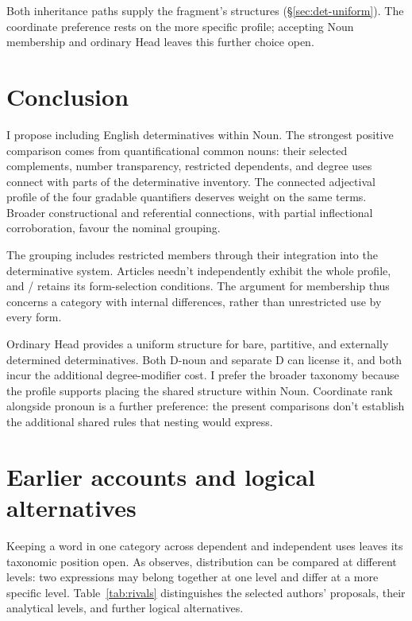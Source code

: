 \documentclass[12pt]{article}
\begin{document}
Both inheritance paths supply the fragment's structures (§\ref{sec:det-uniform}). The coordinate preference rests on the more specific profile; accepting Noun membership and ordinary Head leaves this further choice open.

\section{Conclusion}\label{sec:conclusion}

I propose including English determinatives within Noun. The strongest positive comparison comes from quantificational common nouns: their selected complements, number transparency, restricted dependents, and degree uses connect with parts of the determinative inventory. The connected adjectival profile of the four gradable quantifiers deserves weight on the same terms. Broader constructional and referential connections, with partial inflectional corroboration, favour the nominal grouping.

The grouping includes restricted members through their integration into the determinative system. Articles needn't independently exhibit the whole profile, and / retains its form-selection conditions. The argument for membership thus concerns a category with internal differences, rather than unrestricted use by every form.

Ordinary Head provides a uniform structure for bare, partitive, and externally determined determinatives. Both D-noun and separate D can license it, and both incur the additional degree-modifier cost. I prefer the broader taxonomy because the profile supports placing the shared structure within Noun. Coordinate rank alongside pronoun is a further preference: the present comparisons don't establish the additional shared rules that nesting would express.

\appendix

\section{Earlier accounts and logical alternatives}\label{sec:historical}

Keeping a word in one category across dependent and independent uses leaves its taxonomic position open. As \textcite[232--235]{lyons1968} observes, distribution can be compared at different levels: two expressions may belong together at one level and differ at a more specific level. Table~\ref{tab:rivals} distinguishes the selected authors' proposals, their analytical levels, and further logical alternatives.
\end{document}
